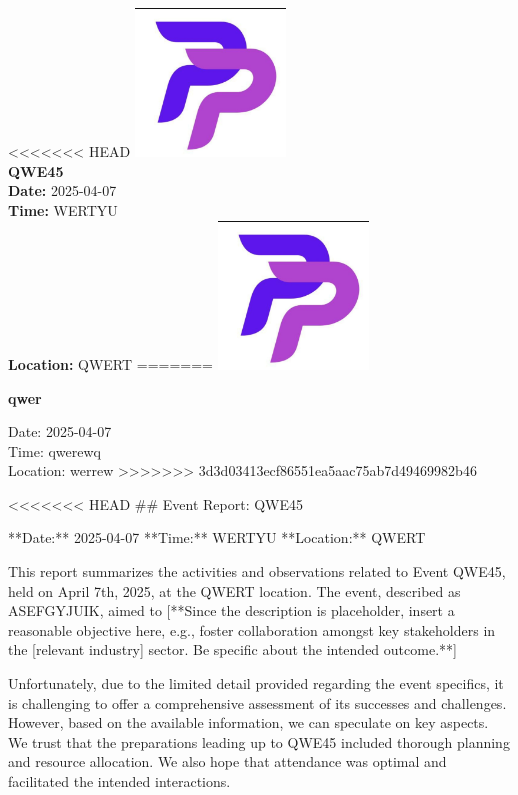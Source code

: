 \documentclass{article}
\begin{document}
\begin{center}
<<<<<<< HEAD
    \includegraphics[width=0.3\textwidth]{logo.png}\\[0.5cm]
    {\LARGE \textbf{QWE45}}\\[0.3cm]
    \normalsize
    \textbf{Date:} 2025-04-07 \\
    \textbf{Time:} WERTYU \\
    \textbf{Location:} QWERT
=======
    \includegraphics[width=0.3\textwidth]{logo.png}
    \vspace{0.5cm}

   \LARGE \textbf{qwer}

    \vspace{0.3cm}
    \normalsize Date: 2025-04-07 \\
    Time: qwerewq \\
    Location: werrew
>>>>>>> 3d3d03413ecf86551ea5aac75ab7d49469982b46
\end{center}

\vspace{1cm}

<<<<<<< HEAD
\#\# Event Report: QWE45

**Date:** 2025-04-07
**Time:** WERTYU
**Location:** QWERT

This report summarizes the activities and observations related to Event QWE45, held on April 7th, 2025, at the QWERT location. The event, described as ASEFGYJUIK, aimed to [**Since the description is placeholder, insert a reasonable objective here, e.g., foster collaboration amongst key stakeholders in the [relevant industry] sector. Be specific about the intended outcome.**]

Unfortunately, due to the limited detail provided regarding the event specifics, it is challenging to offer a comprehensive assessment of its successes and challenges. However, based on the available information, we can speculate on key aspects. We trust that the preparations leading up to QWE45 included thorough planning and resource allocation. We also hope that attendance was optimal and facilitated the intended interactions.
\end{document}
